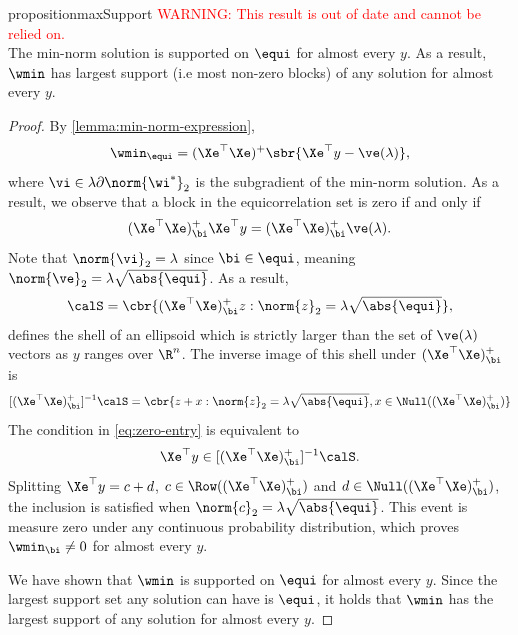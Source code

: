 \begin{restatable}{proposition}{maxSupport}\label{prop:max-support}
	\textcolor{red}{WARNING: This result is out of date and cannot be relied on.}\\

	The min-norm solution is supported on \( \equi \) for almost
	every \( y \).
	As a result, \( \wmin \) has largest support (i.e most non-zero blocks) of
	any solution for almost every \( y \).
\end{restatable}
\begin{proof}
	By \cref{lemma:min-norm-expression},
	\[
		\wmin_{\equi} = (\Xe^\top \Xe)^+\sbr{\Xe^\top y - \ve(\lambda)},
	\]
	where \( \vi \in \lambda \partial \norm{\wi^*}_2 \) is the subgradient
	of the min-norm solution.
	As a result, we observe that a block in the equicorrelation set is zero
	if and only if
	\begin{equation}\label{eq:zero-entry}
		(\Xe^\top \Xe)^+_\bi \Xe^\top y  = (\Xe^\top \Xe)^+_\bi \ve(\lambda).
	\end{equation}
	Note that \( \norm{\vi}_2 = \lambda \) since \( \bi \in \equi \),
	meaning \( \norm{\ve}_2 = \lambda \sqrt{\abs{\equi}} \).
	As a result,
	\[
		\calS = \cbr{ (\Xe^\top \Xe)^+_\bi z :
			\norm{z}_2 = \lambda \sqrt{\abs{\equi}}
		},
	\]
	defines the shell of an ellipsoid which is strictly larger than the set of \( \ve(\lambda) \) vectors as \( y \) ranges over \( \R^n \).
	The inverse image of this shell under \( (\Xe^\top \Xe)^+_\bi \) is
	\[
		[(\Xe^\top \Xe)^+_\bi]^{-1} \calS
		= \cbr{z + x
			: \norm{z}_2 = \lambda \sqrt{\abs{\equi}},
			x \in \Null((\Xe^\top \Xe)^+_\bi)}
	\]
	The condition in \cref{eq:zero-entry} is equivalent to
	\[
		\Xe^\top y \in [(\Xe^\top \Xe)^+_\bi]^{-1} \calS.
	\]
	Splitting \( \Xe^\top y = c + d \), \( c \in \Row((\Xe^\top \Xe)^+_\bi) \)
	and \( d \in \Null((\Xe^\top \Xe)^+_\bi) \),
	the inclusion is satisfied when \( \norm{c}_2 = \lambda \sqrt{\abs{\equi}} \).
	This event is measure zero under any continuous probability distribution,
	which proves \( \wmin_\bi \neq 0 \) for almost every \( y \).

	We have shown that
	\( \wmin \) is supported on \( \equi \) for almost every \( y \).
	Since the largest support set any solution can have is \( \equi \),
	it holds that \( \wmin \) has the largest support of any solution
	for almost every \( y \).
\end{proof}
